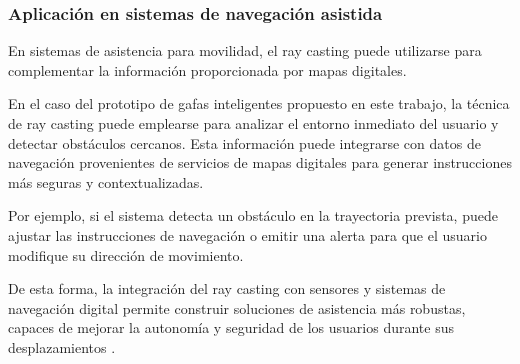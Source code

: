 \subsubsection{Aplicación en sistemas de navegación asistida}

En sistemas de asistencia para movilidad, el ray casting puede utilizarse para complementar la información proporcionada por mapas digitales.

En el caso del prototipo de gafas inteligentes propuesto en este trabajo, la técnica de ray casting puede emplearse para analizar el entorno inmediato del usuario y detectar obstáculos cercanos. Esta información puede integrarse con datos de navegación provenientes de servicios de mapas digitales \cite{zbotic_gps} para generar instrucciones más seguras y contextualizadas.

Por ejemplo, si el sistema detecta un obstáculo en la trayectoria prevista, puede ajustar las instrucciones de navegación o emitir una alerta para que el usuario modifique su dirección de movimiento.

De esta forma, la integración del ray casting con sensores y sistemas de navegación digital permite construir soluciones de asistencia más robustas, capaces de mejorar la autonomía y seguridad de los usuarios durante sus desplazamientos \cite{elfes1989, wikipedia_slam}.